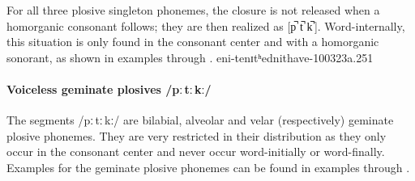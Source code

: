 For all three plosive singleton phonemes, the closure is not released when a homorganic consonant %
follows; they are then realized as [p̚ t̚ k̚\,]. Word-internally, this situation is only found in the consonant center and with a homorganic sonorant, as shown in examples  through . 
{eni-t}{enɪtʰ}{ednit}{have-}{100323a}{.251}


\paragraph{Voiceless geminate plosives /pː\,tː\,kː/}
The segments /pː\,tː\,kː/ are bilabial, alveolar and velar (respectively) geminate plosive phonemes. They are very restricted in their distribution as they only occur in the consonant center %
and never occur word-initially or word-finally. %
Examples for the geminate plosive phonemes can be found in examples  through .

